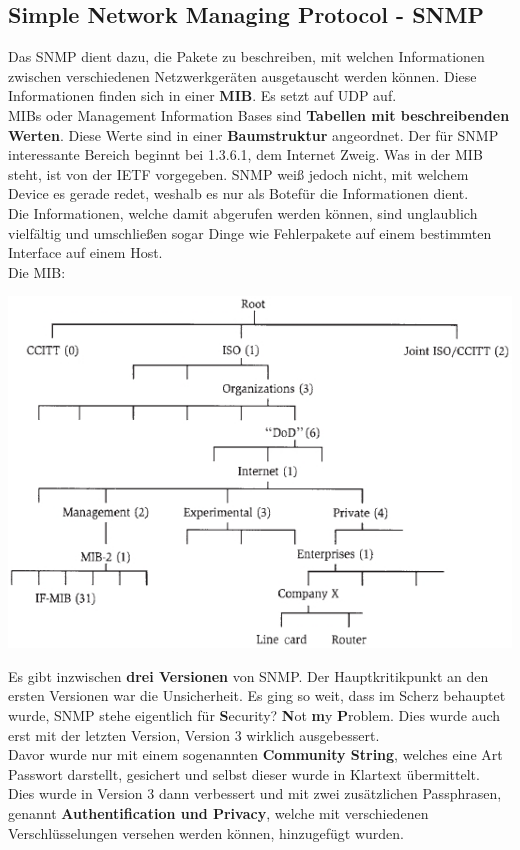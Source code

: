 \documentclass[12pt,a4paper]{report}
\begin{document}
\begin{onehalfspace}
\subsection{Simple Network Managing Protocol - SNMP}
Das SNMP dient dazu, die Pakete zu beschreiben, mit welchen Informationen zwischen verschiedenen Netzwerkgeräten ausgetauscht werden können. Diese Informationen finden sich in einer \textbf{MIB}. Es setzt auf UDP auf.\\

MIBs oder Management Information Bases sind \textbf{Tabellen mit beschreibenden Werten}. Diese Werte sind in einer \textbf{Baumstruktur} angeordnet. Der für SNMP interessante Bereich beginnt bei 1.3.6.1, dem Internet Zweig. Was in der MIB steht, ist von der IETF vorgegeben. SNMP weiß jedoch nicht, mit welchem Device es gerade redet, weshalb es nur als \glqq Bote\grqq für die Informationen dient.\\
Die Informationen, welche damit abgerufen werden können, sind unglaublich vielfältig und umschließen sogar Dinge wie Fehlerpakete auf einem bestimmten Interface auf einem Host.\\

Die MIB:
\begin{center}
\includegraphics[scale=0.7]{../docs/tarkes/pics/mib.jpg}
\end{center}

Es gibt inzwischen \textbf{drei Versionen} von SNMP. Der Hauptkritikpunkt an den ersten Versionen war die Unsicherheit. Es ging so weit, dass im Scherz behauptet wurde, SNMP stehe eigentlich für \textbf{S}ecurity? \textbf{N}ot \textbf{m}y \textbf{P}roblem. Dies wurde auch erst mit der letzten Version, Version 3 wirklich ausgebessert.\\
Davor wurde nur mit einem sogenannten \textbf{Community String}, welches eine Art Passwort darstellt, gesichert und selbst dieser wurde in Klartext übermittelt.\\
Dies wurde in Version 3 dann verbessert und mit zwei zusätzlichen Passphrasen, genannt \textbf{Authentification und Privacy}, welche mit verschiedenen Verschlüsselungen versehen werden können, hinzugefügt wurden.\\


\end{onehalfspace}
\end{document}
